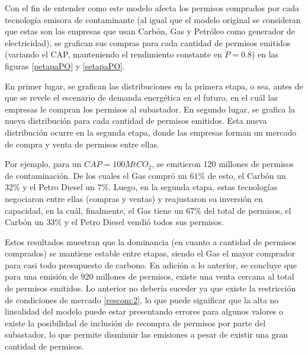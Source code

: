 Con el fin de entender como este modelo afecta los permisos comprados por cada tecnología emisora de contaminante (al igual que el modelo original se consideran que estas son las empresas que usan Carbón, Gas y Petróleo como generador de electricidad), se grafican sus compras para cada cantidad de permisos emitidos (variando el CAP, manteniendo el rendimiento constante en $P=0.8$) en las figuras \ref{petapaPO} y \ref{setapaPO}.
\vspace{2.5mm}

En primer lugar, se grafican las distribuciones en la primera etapa, o sea, antes de que se revele el escenario de demanda energética en el futuro, en el cuál las empresas le compran los permisos al subastador. En segundo lugar, se grafica la nueva distribución para cada cantidad de permisos emitidos. Esta nueva distribución ocurre en la segunda etapa, donde las empresas forman un mercado de compra y venta de permisos entre ellas.
\vspace{2.5mm}

Por ejemplo, para un $CAP=100MtCO_2$, se emitieron 120 millones de permisos de contaminación. De los cuales el Gas compró un $61\%$ de esto, el Carbón un $32\%$ y el Petro Diesel un $7\%$. Luego, en la segunda etapa, estas tecnologías negociaron entre ellas (compras y ventas) y reajustaron su inversión en capacidad, en la cuál, finalmente, el Gas tiene un $67\%$ del total de permisos, el Carbón un $33\%$ y el Petro Diesel vendió todos sus permisos. 
\vspace{2.5mm}

Estos resultados muestran que la dominancia (en cuanto a cantidad de permisos comprados) se mantiene estable entre etapas, siendo el Gas el mayor comprador para casi todo presupuesto de carbono. En adición a lo anterior, se concluye que para una emisión de $920$ millones de permisos, existe una venta cercana al total de permisos emitidos. Lo anterior no debería suceder ya que existe la restricción de condiciones de mercado \ref{rescom:2}, lo que puede significar que la alta no linealidad del modelo puede estar presentando errores para algunos valores o existe la posibilidad de inclusión de recompra de permisos por parte del subastador, lo que permite disminuir las emisiones a pesar de existir una gran cantidad de permisos.
\vspace{2.5mm}

